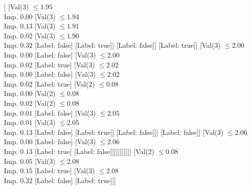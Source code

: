 \documentclass[margin=10pt]{standalone}
\begin{document}
\begin{forest}
									[Val($2$) $ \leq 0.08$ \\ Imp. $0.00$
										[Label: false]
										[Val($2$) $ \leq 0.08$ \\ Imp. $0.01$
											[Val($3$) $ \leq 2.00$ \\ Imp. $0.26$
												[Label: true]
												[Label: false]]
											[Val($3$) $ \leq 1.95$ \\ Imp. $0.00$
												[Val($3$) $ \leq 1.94$ \\ Imp. $0.13$
													[Val($3$) $ \leq 1.91$ \\ Imp. $0.02$
														[Val($3$) $ \leq 1.90$ \\ Imp. $0.32$
															[Label: false]
															[Label: true]]
														[Label: false]]
													[Label: true]]
												[Val($3$) $ \leq 2.00$ \\ Imp. $0.00$
													[Label: false]
													[Val($3$) $ \leq 2.00$ \\ Imp. $0.02$
														[Label: true]
														[Val($3$) $ \leq 2.02$ \\ Imp. $0.00$
															[Label: false]
															[Val($3$) $ \leq 2.02$ \\ Imp. $0.02$
																[Label: true]
																[Val($2$) $ \leq 0.08$ \\ Imp. $0.00$
																	[Val($2$) $ \leq 0.08$ \\ Imp. $0.02$
																		[Val($2$) $ \leq 0.08$ \\ Imp. $0.01$
																			[Label: false]
																			[Val($3$) $ \leq 2.05$ \\ Imp. $0.01$
																				[Val($3$) $ \leq 2.05$ \\ Imp. $0.13$
																					[Label: false]
																					[Label: true]]
																				[Label: false]]]
																		[Label: false]]
																	[Val($3$) $ \leq 2.06$ \\ Imp. $0.00$
																		[Label: false]
																		[Val($3$) $ \leq 2.06$ \\ Imp. $0.13$
																			[Label: true]
																			[Label: false]]]]]]]]]]]
									[Val($2$) $ \leq 0.08$ \\ Imp. $0.05$
										[Val($3$) $ \leq 2.08$ \\ Imp. $0.15$
											[Label: true]
											[Val($3$) $ \leq 2.08$ \\ Imp. $0.32$
												[Label: false]
												[Label: true]]]

\end{forest}
\end{document}
